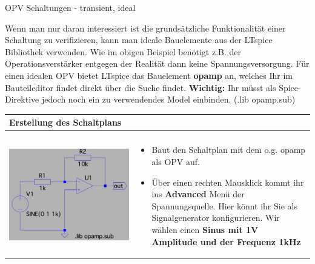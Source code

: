\begin{frame}[t]{OPV Schaltungen - transient, ideal}
\begin{spacing}{0.6}
\begin{tiny}
      Wenn man nur daran interessiert ist die grundsätzliche Funktionalität einer Schaltung zu verifizieren, kann man ideale
      Bauelemente aus der LTspice Bibliothek verwenden. Wie im obigen Beispiel benötigt z.B. der Operationsverstärker entgegen der Realität dann keine Spannungsversorgung.
      Für einen idealen OPV bietet LTspice das Bauelement \textbf{opamp} an, welches Ihr im Bauteileditor findet direkt über die Suche findet. \newline
      \textbf{Wichtig:} Ihr müsst als Spice-Direktive jedoch noch ein zu verwendendes Model einbinden. (.lib opamp.sub)
    \end{tiny} \end{spacing}
  \begin{spacing}{0.9} \begin{tiny}
      \begin{table}[h!]
        \begin{tabular}{p{3cm} p{7cm}}
          \hline
          \textbf{Erstellung des Schaltplans} & \\
          \hline                                \\
          \begin{minipage}{.3\textwidth}
            \includegraphics[width=0.8\linewidth]{pictures/opamp_1.png}
          \end{minipage}
                                              &
          \begin{minipage}{.7\textwidth}
            \begin{itemize}
              \item Baut den Schaltplan mit dem o.g. opamp als OPV auf.
              \item Über einen rechten Mausklick kommt ihr ins \textbf{Advanced} Menü der Spannungsquelle. Hier könnt ihr Sie als Signalgenerator konfigurieren. Wir wählen einen \textbf{Sinus mit 1V Amplitude und der Frequenz 1kHz}

\end{itemize}
\end{minipage}
\end{tabular}
\end{table}
\end{tiny}
\end{spacing}
\end{frame}
